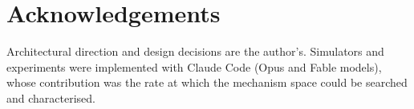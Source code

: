 \documentclass[11pt]{article}
\begin{document}
\hypertarget{acknowledgements}{%
\section*{Acknowledgements}\label{acknowledgements}}

Architectural direction and design decisions are the author's.
Simulators and experiments were implemented with Claude Code
\cite{anthropic2025claudecode} (Opus and Fable models), whose
contribution was the rate at which the mechanism space could be searched
and characterised.




\end{document}
